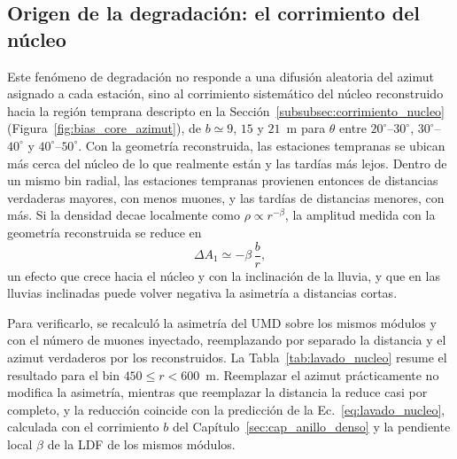 \subsection{Origen de la degradación: el corrimiento del núcleo}
\label{subsec:lavado_nucleo}

Este fenómeno de degradación no responde a una difusión aleatoria del azimut asignado a cada estación, sino al corrimiento sistemático del núcleo reconstruido hacia la región temprana descripto en la Sección~\ref{subsubsec:corrimiento_nucleo} (Figura~\ref{fig:bias_core_azimut}), de $b \simeq 9$, $15$ y $21$~m para $\theta$ entre $20^\circ$--$30^\circ$, $30^\circ$--$40^\circ$ y $40^\circ$--$50^\circ$. Con la geometría reconstruida, las estaciones tempranas se ubican más cerca del núcleo de lo que realmente están y las tardías más lejos. Dentro de un mismo bin radial, las estaciones tempranas provienen entonces de distancias verdaderas mayores, con menos muones, y las tardías de distancias menores, con más. Si la densidad decae localmente como $\rho \propto r^{-\beta}$, la amplitud medida con la geometría reconstruida se reduce en
\begin{equation}
	\Delta A_1 \simeq -\beta\,\frac{b}{r},
	\label{eq:lavado_nucleo}
\end{equation}
un efecto que crece hacia el núcleo y con la inclinación de la lluvia, y que en las lluvias inclinadas puede volver negativa la asimetría a distancias cortas.

Para verificarlo, se recalculó la asimetría del UMD sobre los mismos módulos y con el número de muones inyectado, reemplazando por separado la distancia y el azimut verdaderos por los reconstruidos. La Tabla~\ref{tab:lavado_nucleo} resume el resultado para el bin $450 \leq r < 600$~m. Reemplazar el azimut prácticamente no modifica la asimetría, mientras que reemplazar la distancia la reduce casi por completo, y la reducción coincide con la predicción de la Ec.~\ref{eq:lavado_nucleo}, calculada con el corrimiento $b$ del Capítulo~\ref{sec:cap_anillo_denso} y la pendiente local $\beta$ de la LDF de los mismos módulos.

